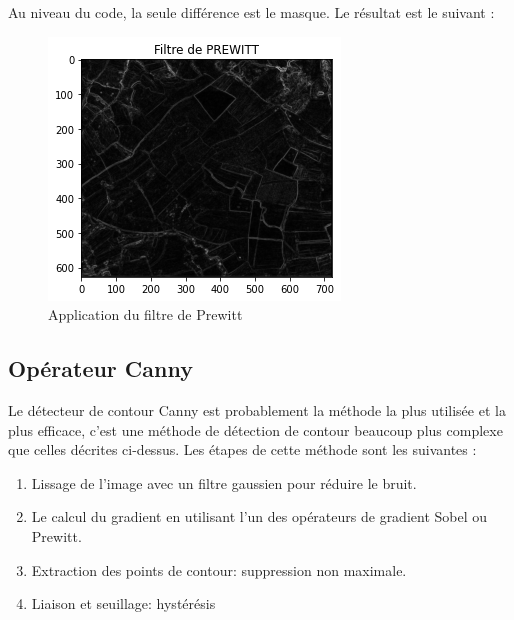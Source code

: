 \documentclass[12pt, openany]{report}
\begin{document}
Au niveau du code, la seule différence est le masque.
Le résultat est le suivant : 
\begin{figure}[H]
\centering
\includegraphics[scale=0.9]{prewitt_result.png}
\caption{Application du filtre de Prewitt}
\end{figure}

\subsection{Opérateur Canny}
Le détecteur de contour Canny est probablement la méthode la plus utilisée et la plus efficace, c'est une méthode de détection de contour beaucoup plus complexe que celles décrites ci-dessus.
\noindent Les étapes de cette méthode sont les suivantes :
\begin{enumerate}
    \item Lissage de l'image avec un filtre gaussien pour réduire le bruit.
    \item Le calcul du gradient en utilisant l'un des opérateurs de gradient Sobel ou Prewitt.
    \item Extraction des points de contour: suppression non maximale.
    \item Liaison et seuillage: hystérésis
\end{enumerate}
\end{document}

